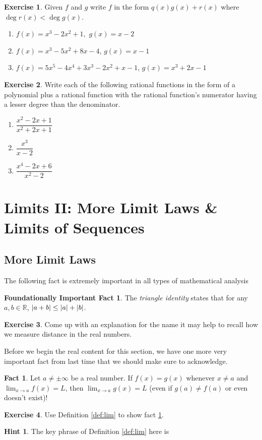 \documentclass[english]{book}
\DeclarePairedDelimiter\abs{\lvert}{\rvert}%
\newcommand{\RR}{\mathbb{R}}
\theoremstyle{remark}
\theoremstyle{definition}
\newtheorem{excs}{Exercise}[chapter]
\newtheorem{hint}{Hint}[excs]
\newtheorem*{next week}{Next Week}
\newtheorem{fact}[theorem]{Fact}
\newtheorem{fifact}[theorem]{Foundationally Important Fact}
\newcommand{\dlim}{\displaystyle\lim}
\begin{document}
\begin{excs}
	Given $f$ and $g$ write $f$ in the form $q(x)g(x)+r(x)$ where $\deg r(x)<\deg g(x)$.
	\begin{enumerate}[label=\alph*)]
		\item $f(x)=x^3-2x^2+1,$ $g(x)=x-2$
		\item $f(x)=x^3-5x^2+8x-4$, $g(x)=x-1$
		\item $f(x)=5x^5-4x^4+3x^3-2x^2+x-1$,  $g(x)=x^3+2x-1$
		
	\end{enumerate}
\end{excs}
\begin{excs}
	Write each of the following rational functions in the form of a polynomial plus a rational function with the rational function's numerator having a lesser degree than the denominator.
	\begin{enumerate}[label=\alph*)]
		\item $\dfrac{x^2-2x+1}{x^2+2x+1}$
		\item $\dfrac{x^3}{x-2}$
		\item $\dfrac{x^4-2x+6}{x^2-2}$
	\end{enumerate}
\end{excs}
\section{Limits II: More Limit Laws \& Limits of Sequences}
\subsection{More Limit Laws}The following fact is extremely important in all types of mathematical analysis
\begin{fifact}\label{trident}
The \emph{triangle identity} states that for any $a,b \in \RR$, $\abs{a+b}\leq \abs{a}+\abs{b}$.
\end{fifact}
\begin{excs}
	Come up with an explanation for the name \textemdash it may help to recall how we measure distance in the real numbers.
\end{excs}
Before we begin the real content for this section, we have one more very important fact from last time that we should make sure to acknowledge.
\begin{fact}\label{fact:limxneq a} Let $a \neq \pm \infty$ be a real number. 
	If $f(x)=g(x)$ whenever $x\neq a$ and $\dlim_{x\to a}f(x)=L$, then $\dlim_{x\to a}g(x)=L$ (even if $g(a)\neq f(a)$ or even doesn't exist)!
\end{fact}
\begin{excs}
	Use Definition \ref{def:lim} to show fact \ref{fact:limxneq a}.
\end{excs}
\begin{hint}
	The key phrase of Definition \ref{def:lim} here is
	\end{hint}
\end{document}
